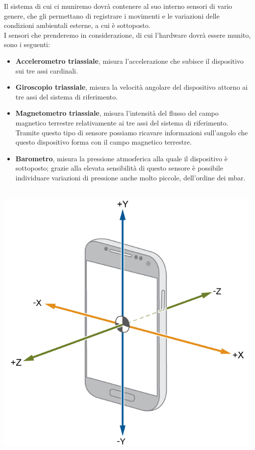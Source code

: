 \documentclass[a4paper]{article}
\begin{document}
Il sistema di cui ci muniremo dovrà contenere al suo interno sensori di vario genere, che gli permettano di registrare i movimenti e le variazioni delle condizioni ambientali esterne, a cui è sottoposto. \\
I sensori che prenderemo in considerazione, di cui l'hardware dovrà essere munito, sono i seguenti:
\begin{itemize}
\item \textbf{Accelerometro triassiale}, misura l’accelerazione che subisce il dispositivo sui tre assi cardinali.
\item \textbf{Giroscopio triassiale}, misura la velocità angolare del dispositivo attorno ai tre assi del sistema di riferimento.
\item \textbf{Magnetometro triassiale}, misura l’intensità del flusso del campo magnetico terrestre relativamente ai tre assi del sistema di riferimento. Tramite questo tipo di sensore possiamo ricavare informazioni sull’angolo che questo dispositivo forma con il campo magnetico terrestre.
\item \textbf{Barometro}, misura la pressione atmosferica alla quale il dispositivo è sottoposto; grazie alla elevata sensibilità di questo sensore è possibile individuare variazioni di pressione anche molto piccole, dell’ordine dei mbar.\\ \\
\end{itemize}

\begin{center}
\begin{minipage}{0.48\linewidth}
\includegraphics[width=\linewidth]{./images/triaxial_sensor.png}
\makebox[\linewidth]{}
\end{minipage}
\end{center}
\end{document}
